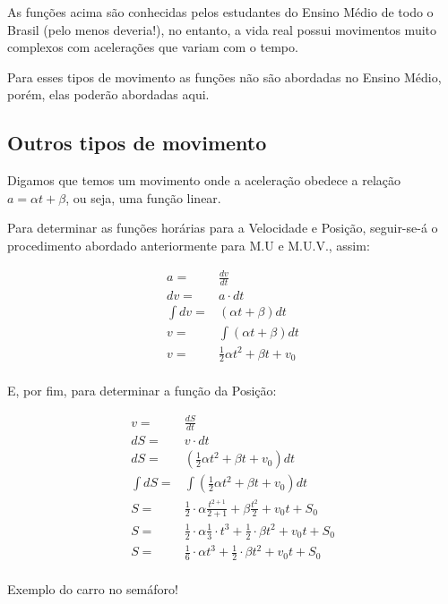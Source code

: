 As funções acima são conhecidas pelos estudantes do Ensino Médio de todo o Brasil (pelo menos deveria!), no entanto, a vida real possui movimentos muito complexos com acelerações que variam com o tempo. 

Para esses tipos de movimento as funções não são abordadas no Ensino Médio, porém, elas poderão abordadas aqui.

\subsection{Outros tipos de movimento}


Digamos que temos um movimento onde a aceleração obedece a relação $a = \alpha t + \beta$, ou seja, uma função linear.

Para determinar as funções horárias para a Velocidade e Posição, seguir-se-á o procedimento abordado anteriormente para M.U e M.U.V., assim:

\begin{ceqn}
    \begin{align*}
        a =& \frac{dv}{dt} \\
        dv =& a \cdot dt \\
        \int dv =& (\alpha t + \beta) dt \\
        v =& \int (\alpha t + \beta) dt \\
        v =& \frac{1}{2} \alpha t^2 + \beta t + v_0 \\
    \end{align*}
\end{ceqn}

E, por fim, para determinar a função da Posição:

\begin{ceqn}
    \begin{align*}
        v =& \frac{dS}{dt} \\
        dS =& v \cdot dt \\
        dS =& (\frac{1}{2} \alpha t^2 + \beta t + v_0) dt \\
        \int dS =& \int (\frac{1}{2} \alpha t^2 + \beta t + v_0) dt \\
        S =& \frac{1}{2} \cdot \alpha \frac{t^{2+1}}{2+1} + \beta \frac{t^2}{2} + v_0 t + S_0 \\
        S =& \frac{1}{2} \cdot \alpha \frac{1}{3} \cdot t^3 + \frac{1}{2} \cdot \beta t^2 + v_0 t + S_0 \\
        S =& \frac{1}{6} \cdot \alpha t^3 + \frac{1}{2} \cdot \beta t^2 + v_0 t + S_0 \\
    \end{align*}
\end{ceqn}

Exemplo do carro no semáforo!







